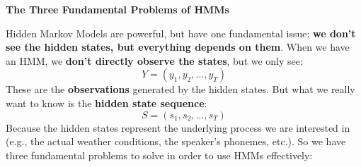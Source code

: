 \highspace
\begin{flushleft}
    \textcolor{Red2}{ \textbf{The Three Fundamental Problems of HMMs}}
\end{flushleft}
Hidden Markov Models are powerful, but have one fundamental issue: \textbf{we don't see the hidden states, but everything depends on them}. When we have an HMM, we \textbf{don't directly observe the states}, but we only see:
\begin{equation*}
    Y = \left(y_1, y_2, \ldots, y_T\right)
\end{equation*}
These are the \textbf{observations} generated by the hidden states. But what we really want to know is the \textbf{hidden state sequence}:
\begin{equation*}
    S = \left(s_1, s_2, \ldots, s_T\right)
\end{equation*}
Because the hidden states represent the underlying process we are interested in (e.g., the actual weather conditions, the speaker's phonemes, etc.). So we have three fundamental problems to solve in order to use HMMs effectively:
